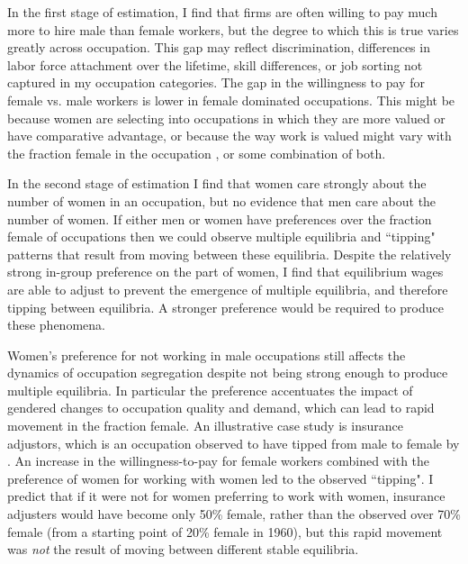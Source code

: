 \documentclass[11pt]{article}
\begin{document}
In the first stage of estimation, I find that firms are often willing to pay much more to hire male than female workers, but the degree to which this is true varies greatly across occupation. This gap may reflect discrimination, differences in labor force attachment over the lifetime, skill differences, or job sorting not captured in my occupation categories. The gap in the willingness to pay for female vs. male workers is lower in female dominated occupations. This might be because women are selecting into occupations in which they are more valued or have comparative advantage, or because the way work is valued might vary with the fraction female in the occupation \cite{Levanon2009, Harris2018}, or some combination of both.


In the second stage of estimation I find that women care strongly about the number of women in an occupation, but no evidence that men care about the number of women. If either men or women have preferences over the fraction female of occupations then we could observe multiple equilibria and ``tipping" patterns that result from moving between these equilibria. Despite the relatively strong in-group preference on the part of women, I find that equilibrium wages are able to adjust to prevent the emergence of multiple equilibria, and therefore tipping between equilibria. A stronger preference would be required to produce these phenomena.



Women's preference for not working in male occupations still affects the dynamics of occupation segregation despite not being strong enough to produce multiple equilibria. In particular the preference accentuates the impact of gendered changes to occupation quality and demand, which can lead to rapid movement in the fraction female. An illustrative case study is insurance adjustors, which is an occupation observed to have tipped from male to female by . An increase in the willingness-to-pay for female workers combined with the preference of women for working with women led to the observed ``tipping".  I predict that if it were not for women preferring to work with women, insurance adjusters would have become only 50\% female, rather than the observed over 70\% female (from a starting point of 20\% female in 1960), but this rapid movement was \textit{not} the result of moving between different stable equilibria. 
\end{document}
